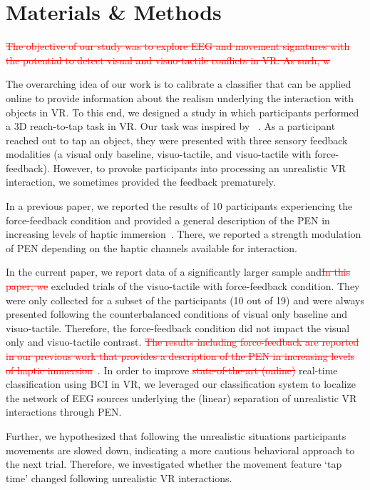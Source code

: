 \section{Materials \& Methods}
\textcolor{red}{\st{The objective of our study was to explore EEG and movement signatures with the potential to detect visual and visuo-tactile conflicts in VR. As such, w}}

\textcolor{n}{The overarching idea of our work is to calibrate a classifier that can be applied online to provide information about the realism underlying the interaction with objects in VR.} \textcolor{n}{To this end,} we designed a study in which participants performed a 3D reach-to-tap task in VR. Our task was inspired by ~\cite{Singh2018-qi}. As a participant reached out to tap an object, they were presented with three sensory feedback modalities (a visual only baseline, visuo-tactile, and visuo-tactile with force-feedback). However, to provoke participants into processing an unrealistic VR interaction, we sometimes provided the feedback prematurely.

\textcolor{n}{In a previous paper, we reported the results of 10 participants experiencing the force-feedback condition and provided a general description of the PEN in increasing levels of haptic immersion~\cite{Gehrke2019-og}. There, we reported a strength modulation of PEN depending on the haptic channels available for interaction.}

\textcolor{n}{In the current paper, we report data of a significantly larger sample and}\textcolor{red}{\st{In this paper, we}} excluded trials of the visuo-tactile with force-feedback condition. They were only collected for a subset of the participants \textcolor{n}{(10 out of 19)} and were always presented following the counterbalanced conditions of visual only baseline and visuo-tactile. Therefore, the force-feedback condition did not impact the visual only and visuo-tactile contrast. \textcolor{red}{\st{The results including force-feedback are reported in our previous work that provides a description of the PEN in increasing levels of haptic immersion}}~\cite{Gehrke2019-og}. In order to improve \textcolor{red}{\st{state-of-the-art (online)}} \textcolor{n}{real-time} classification using BCI in VR, we leveraged our classification system to localize the network of EEG sources underlying the (linear) separation of unrealistic VR interactions through PEN.

\textcolor{n}{Further, we hypothesized that following the unrealistic situations participants movements are slowed down, indicating a more cautious behavioral approach to the next trial. Therefore, we investigated whether the movement feature `tap time' changed following unrealistic VR interactions.}


